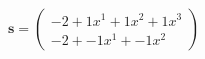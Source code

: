 \documentclass[preview]{standalone}
\begin{document}
\begin{align*}
\mathbf{s} = \begin{pmatrix}-2 + 1x^{1} + 1x^{2} + 1x^{3} \\ -2 + -1x^{1} + -1x^{2}\end{pmatrix}
\end{align*}
\end{document}
